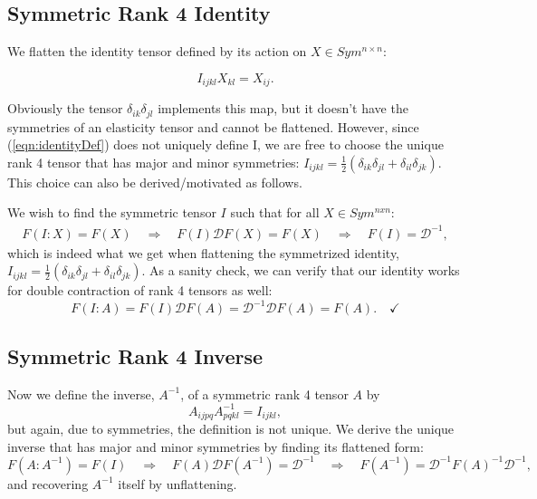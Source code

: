 \documentclass[10pt]{article}
\begin{document}
\subsection{Symmetric Rank 4 Identity}
We flatten the identity tensor defined by its action  on $X \in Sym^{n \times
n}$:

\begin{equation}
\label{eqn:identityDef}
I_{ijkl} X_{kl} =  X_{ij}.
\end{equation}

Obviously the tensor $\delta_{ik} \delta_{jl}$ implements this map, but it
doesn't have the symmetries of an elasticity tensor and cannot be flattened.
However, since (\ref{eqn:identityDef}) does not
uniquely define I, we are free to choose the unique rank 4 tensor that has major and
minor symmetries:
$I_{ijkl} = \frac{1}{2}\left(\delta_{ik} \delta_{jl} + \delta_{il} \delta_{jk} \right)$.
This choice can also be derived/motivated as follows.

We wish to find the symmetric tensor $I$ such that for all $X \in Sym^{nxn}$:
\begin{gather*}
F(I : X) = F(X) \quad \Longrightarrow \quad
F(I) \mathscr{D} F(X) = F(X) \quad \Longrightarrow \quad
\boxed{
F(I) = \mathscr{D}^{-1},}
\end{gather*}
which is indeed what we get when flattening the symmetrized identity,
$I_{ijkl} = \frac{1}{2}\left(\delta_{ik} \delta_{jl} + \delta_{il} \delta_{jk}
\right)$. As a sanity check, we can verify that our identity works for double
contraction of rank 4 tensors as well:
$$
F(I : A) = F(I) \mathscr{D} F(A) = \mathscr{D}^{-1} \mathscr{D} F(A) = F(A). \quad \checkmark
$$

\subsection{Symmetric Rank 4 Inverse}
Now we define the inverse, $A^{-1}$, of a symmetric rank 4 tensor $A$ by
\begin{equation}
\label{eqn:identityDef}
A_{ijpq} A^{-1}_{pqkl} = I_{ijkl},
\end{equation}
but again, due to symmetries, the definition is not unique. We derive the
unique inverse that has major and minor symmetries by finding its flattened
form:
$$
F(A:A^{-1}) = F(I) \quad \Longrightarrow \quad  F(A) \mathscr{D} F(A^{-1}) = \mathscr{D}^{-1} \quad
\Longrightarrow \quad \boxed{F(A^{-1}) = \mathscr{D}^{-1} F(A)^{-1} \mathscr{D}^{-1},}
$$
and recovering $A^{-1}$ itself by unflattening.
\end{document}
